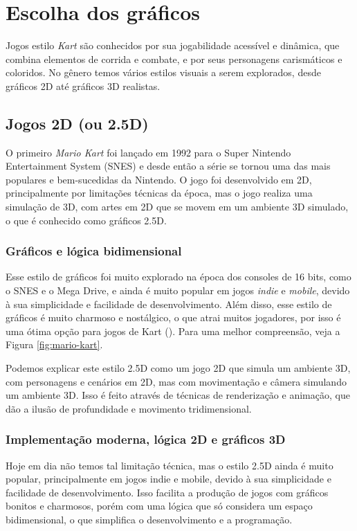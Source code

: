 \chapter{Escolha dos gráficos}

Jogos estilo \textit{Kart} são conhecidos por sua jogabilidade acessível e dinâmica, que combina elementos de corrida e combate, e por seus personagens carismáticos e coloridos. No gênero temos vários estilos visuais a serem explorados, desde gráficos 2D até gráficos 3D realistas.

\section{Jogos 2D (ou 2.5D)}

O primeiro \textit{Mario Kart} foi lançado em 1992 para o Super Nintendo Entertainment System (SNES) e desde então a série se tornou uma das mais populares e bem-sucedidas da Nintendo. O jogo foi desenvolvido em 2D, principalmente por limitações técnicas da época, mas o jogo realiza uma simulação de 3D, com artes em 2D que se movem em um ambiente 3D simulado, o que é conhecido como gráficos 2.5D.

\subsection{Gráficos e lógica bidimensional}

Esse estilo de gráficos foi muito explorado na época dos consoles de 16 bits, como o SNES e o Mega Drive, e ainda é muito popular em jogos \textit{indie} e \textit{mobile}, devido à sua simplicidade e facilidade de desenvolvimento. Além disso, esse estilo de gráficos é muito charmoso e nostálgico, o que atrai muitos jogadores, por isso é uma ótima opção para jogos de Kart (\cite{graficos2.5D}). Para uma melhor compreensão, veja a Figura \ref{fig:mario-kart}.

Podemos explicar este estilo 2.5D como um jogo 2D que simula um ambiente 3D, com personagens e cenários em 2D, mas com movimentação e câmera simulando um ambiente 3D. Isso é feito através de técnicas de renderização e animação, que dão a ilusão de profundidade e movimento tridimensional.

\subsection{Implementação moderna, lógica 2D e gráficos 3D}

Hoje em dia não temos tal limitação técnica, mas o estilo 2.5D ainda é muito popular, principalmente em jogos indie e mobile, devido à sua simplicidade e facilidade de desenvolvimento. Isso facilita a produção de jogos com gráficos bonitos e charmosos, porém com uma lógica que só considera um espaço bidimensional, o que simplifica o desenvolvimento e a programação.

